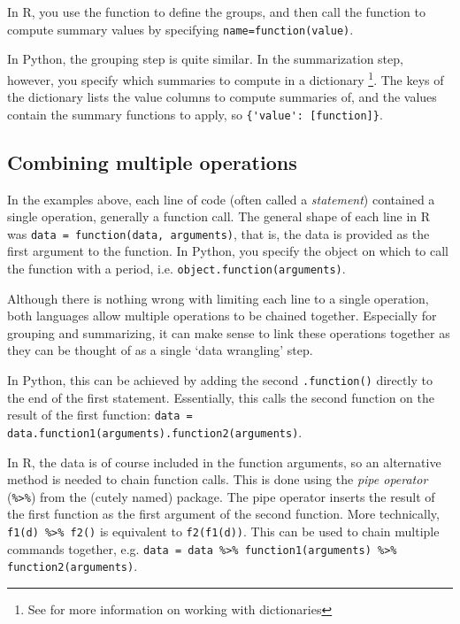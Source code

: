 
In R, you use the  function   to define the groups,
and then call the function  to compute summary values by specifying
\verb+name=function(value)+.

In Python, the grouping step is quite similar.
In the summarization step, however, you specify which summaries to compute in a dictionary%
\footnote{See  for more information on working with dictionaries}.
The keys of the dictionary lists the value columns to compute summaries of,
and the values contain the summary functions to apply, so \verb+{'value': [function]}+.

\subsection{Combining multiple operations}

In the examples above, each line of code (often called a \emph{statement}) contained a single operation, generally a function call.
The general shape of each line in R was \verb+data = function(data, arguments)+, that is, the data is provided as the first argument to the function.
In Python, you specify the object on which to call the function with a period,
i.e. \verb+object.function(arguments)+.

Although there is nothing wrong with limiting each line to a single operation, both languages allow multiple operations to be chained together.
Especially for grouping and summarizing, it can make sense to link these operations together as they can be thought of as a single `data wrangling' step.

In Python, this can be achieved by adding the second \verb+.function()+ directly to the end of the first statement.
Essentially, this calls the second function on the result of the first function: \verb+data = data.function1(arguments).function2(arguments)+.

In R, the data is of course included in the function arguments, so an alternative method is needed to chain function calls.
This is done using the \emph{pipe operator} (\verb+%>%+) from the (cutely named)  package.
The pipe operator inserts the result of the first function as the first argument of the second function.
More technically, \verb+f1(d) %>% f2()+ is equivalent to \verb+f2(f1(d))+.
This can be used to chain multiple commands together, e.g. \verb+data = data %>% function1(arguments) %>% function2(arguments)+.

